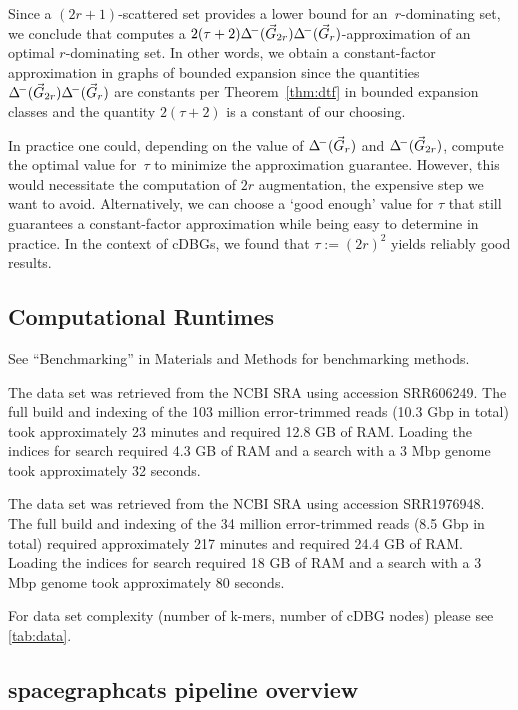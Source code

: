 \noindent
Since a $(2r+1)$-scattered set provides a lower bound for an~$r$-dominating
set, we conclude that  computes a
$2(\tau+2)\Delta^{\!-}(\vec{G}_{2r})\Delta^{\!-}(\vec{G}_r)$-approximation of an
optimal $r$-dominating set. In other words, we obtain a constant-factor
approximation in graphs of bounded expansion since the quantities $\Delta^{\!-}(\vec{G}_{2r})\Delta^{\!-}(\vec{G}_r)$ are constants per Theorem~\ref{thm:dtf} in bounded
expansion classes and the quantity $2(\tau+2)$ is a constant of our choosing.

In practice one could, depending on the value of $\Delta^{\!-}(\vec{G}_r)$
and $\Delta^{\!-}(\vec{G}_{2r})$, compute the optimal value for~$\tau$ to minimize the
approximation guarantee. However, this
would necessitate the computation of $2r$ augmentation, the expensive step we
want to avoid. Alternatively, we can choose a `good enough' value for $\tau$
that still guarantees a constant-factor approximation while being easy to
determine in practice. In the context of cDBGs, we found that
$\tau := (2r)^2$ yields reliably good results.

\subsection{Computational Runtimes}
\label{subsec:runtimes}

See ``Benchmarking'' in Materials and Methods for benchmarking methods.

The \podarv data set was retrieved from the NCBI SRA using accession
SRR606249.  The full build and indexing of the 103 million
error-trimmed reads (10.3 Gbp in total) took approximately 23 minutes
and required 12.8 GB of RAM. Loading the indices for search required
4.3 GB of RAM and a search with a 3 Mbp genome took approximately 32
seconds.

The \hu data set was retrieved from the NCBI SRA using accession
SRR1976948. The full build and indexing of the 34 million
error-trimmed reads (8.5 Gbp in total) required approximately 217
minutes and required 24.4 GB of RAM. Loading the indices for search
required 18 GB of RAM and a search with a 3 Mbp genome took
approximately 80 seconds.

For data set complexity (number of k-mers, number of cDBG nodes) please see
\autoref{tab:data}.

\subsection{spacegraphcats pipeline overview}
\label{subsec:sgc_pipeline}

